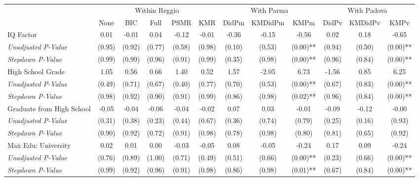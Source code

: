 \begin{tabular}{l c c c c c c c c c c c}
\toprule
& \multicolumn{5}{c}{Within Reggio} & \multicolumn{3}{c}{With Parma} & \multicolumn{3}{c}{With Padova} \\\cmidrule(lr){2-6} \cmidrule(lr){7-9} \cmidrule(lr){10-12}
 & None & BIC & Full & PSMR & KMR & DidPm & KMDidPm & KMPm & DidPv & KMDidPv & KMPv \\
\midrule
IQ Factor & 0.01 & -0.01 & 0.04 & -0.12 & -0.01 & -0.36 & -0.15 & -0.56 & 0.02 & 0.18 & -0.65 \\
\quad \textit{Unadjusted P-Value} & (0.95) & (0.92) & (0.77) & (0.58) & (0.98) & (0.10) & (0.53) & (0.00)** & (0.94) & (0.50) & (0.00)** \\
\quad \textit{Stepdown P-Value} & (0.99) & (0.99) & (0.96) & (0.91) & (0.99) & (0.35) & (0.98) & (0.00)** & (0.96) & (0.84) & (0.00)** \\
High School Grade & 1.05 & 0.56 & 0.66 & 1.40 & 0.52 & 1.57 & -2.05 & 6.73 & -1.56 & 0.85 & 6.25 \\
\quad \textit{Unadjusted P-Value} & (0.49) & (0.71) & (0.67) & (0.40) & (0.77) & (0.70) & (0.53) & (0.00)** & (0.67) & (0.83) & (0.00)** \\
\quad \textit{Stepdown P-Value} & (0.98) & (0.92) & (0.90) & (0.91) & (0.99) & (0.86) & (0.98) & (0.02)** & (0.96) & (0.84) & (0.00)** \\
Graduate from High School & -0.05 & -0.04 & -0.06 & -0.04 & -0.02 & 0.07 & 0.03 & -0.01 & -0.09 & -0.12 & -0.00 \\
\quad \textit{Unadjusted P-Value} & (0.31) & (0.38) & (0.23) & (0.44) & (0.67) & (0.36) & (0.74) & (0.79) & (0.25) & (0.16) & (0.93) \\
\quad \textit{Stepdown P-Value} & (0.90) & (0.92) & (0.72) & (0.91) & (0.98) & (0.78) & (0.98) & (0.80) & (0.81) & (0.65) & (0.92) \\
Max Edu: University & 0.02 & 0.01 & 0.00 & -0.03 & -0.05 & 0.08 & -0.05 & -0.24 & 0.17 & 0.09 & -0.24 \\
\quad \textit{Unadjusted P-Value} & (0.76) & (0.89) & (1.00) & (0.71) & (0.49) & (0.51) & (0.66) & (0.00)** & (0.23) & (0.66) & (0.00)** \\
\quad \textit{Stepdown P-Value} & (0.99) & (0.92) & (0.96) & (0.91) & (0.98) & (0.86) & (0.98) & (0.01)** & (0.67) & (0.84) & (0.00)** \\
\bottomrule
\end{tabular}
